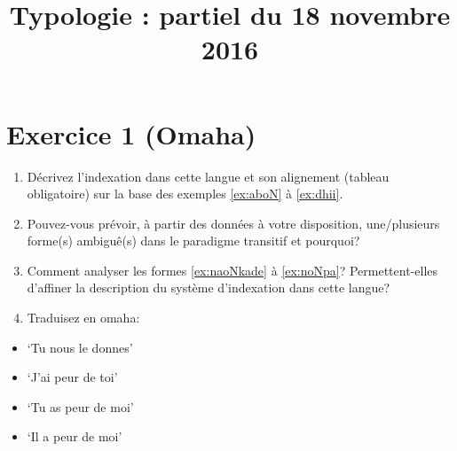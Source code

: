 \documentclass{article}
\begin{document}
\title{Typologie : partiel du 18 novembre 2016}
\date{}
\maketitle
 

\section*{Exercice 1 (Omaha)}

\begin{enumerate}
\item Décrivez l'indexation dans cette langue et son alignement (tableau obligatoire) sur la base des exemples \ref{ex:aboN} à \ref{ex:dhii}.
\item Pouvez-vous prévoir, à partir des données à votre disposition, une/plusieurs forme(s) ambiguê(s) dans le paradigme transitif et pourquoi?
\item Comment analyser les formes \ref{ex:naoNkade} à \ref{ex:noNpa}? Permettent-elles d'affiner la description du système d'indexation dans cette langue?
\item Traduisez en omaha:
\end{enumerate}
\begin{multicols}{3}
\begin{itemize}
\item `Tu nous le donnes'
\item `J'ai peur de toi'
\item `Tu as peur de moi'
\item `Il a peur de moi'
\end{itemize}
\end{multicols}
\end{document}
